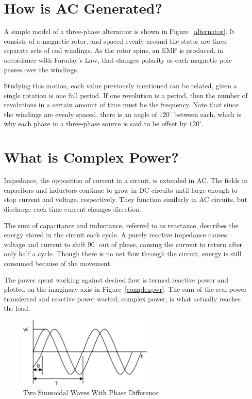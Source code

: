 \documentclass[12pt]{article}
\begin{document}
\section*{How is \ac{AC} Generated?}

A simple model of a three-phase alternator is shown in Figure~\ref{alternator}.
It consists of a magnetic rotor, and spaced evenly around the stator are three
separate sets of coil windings.  As the rotor spins, an \ac{EMF} is produced,
in accordance with Faraday's Law, that changes polarity as each magnetic pole
passes over the windings.

Studying this motion, each value previously mentioned can be related, given a
single rotation is one full period.  If one revolution is a period, then the
number of revolutions in a certain amount of time must be the frequency.  Note
that since the windings are evenly spaced, there is an angle of $120^\circ$
between each, which is why each phase in a three-phase source is said to be
offset by $120^\circ$.

\section*{What is Complex Power?}

Impedance, the opposition of current in a circuit, is extended in \ac{AC}.  The
fields in capacitors and inductors continue to grow in \ac{DC} circuits until
large enough to stop current and voltage, respectively.  They function
similarly in \ac{AC} circuits, but discharge each time current changes
direction.

The sum of capacitance and inductance, referred to as reactance, describes the
energy stored in the circuit each cycle.  A purely reactive impedance causes
voltage and current to shift $90^\circ$ out of phase, causing the current to
return after only half a cycle.  Though there is no net flow through the
circuit, energy is still consumed because of the movement.

The power spent working against desired flow is termed reactive power and
plotted on the imaginary axis in Figure~\ref{complexpwr}.  The sum of the real
power transferred and reactive power wasted, complex power, is what actually
reaches the load.

\begin{figure}[p]
	\centering
	\includegraphics[width=0.6\textwidth]{img/acwave}
	\caption{Two Sinusoidal Waves With Phase Difference}
	\label{acwave}
\end{figure}
\end{document}
